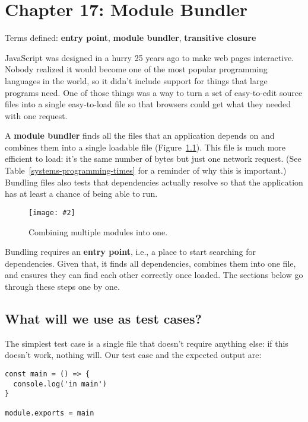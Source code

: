 \documentclass[krantzl]{krantz}
\newcommand{\figpdf}[4]{\begin{figure}%
\centering%
\texttt{[image: \#2]}%
\caption{#3}%
\label{#1}%
\end{figure}}
\newcommand{\figref}[1]{Figure~\ref{#1}}
\newcommand{\tblref}[1]{Table~\ref{#1}}
\newcommand{\glossref}[1]{\textbf{#1}}
\begin{document}
\chapter{Chapter 17: Module Bundler}\label{module-bundler}


\noindent 
    Terms defined:
    \glossref{entry point}, \glossref{module bundler}, \glossref{transitive closure}



JavaScript was designed in a hurry 25 years ago to make web pages interactive.
Nobody realized it would become one of the most popular programming languages in the world,
so it didn't include support for things that large programs need.
One of those things was a way to turn a set of easy-to-edit source files
into a single easy-to-load file
so that browsers could get what they needed with one request.


A \glossref{module bundler}
finds all the files that an application depends on
and combines them into a single loadable file
(\figref{module-bundler-bundling}).
This file is much more efficient to load:
it's the same number of bytes but just one network request.
(See \tblref{systems-programming-times} for a reminder of why this is important.)
Bundling files also tests that dependencies actually resolve
so that the application has at least a chance of being able to run.

\figpdf{module-bundler-bundling}{./module-bundler/bundling.pdf}{Combining multiple modules into one.}{0.6}


Bundling requires an \glossref{entry point},
i.e.,
a place to start searching for dependencies.
Given that,
it finds all dependencies,
combines them into one file,
and ensures they can find each other correctly once loaded.
The sections below go through these steps one by one.

\section{What will we use as test cases?}\label{module-bundler-tests}


The simplest test case is a single file that doesn't require anything else:
if this doesn't work,
nothing will.
Our test case and the expected output are:


\begin{lstlisting}[frame=single,frameround=tttt]
const main = () => {
  console.log('in main')
}

module.exports = main
\end{lstlisting}
\end{document}
